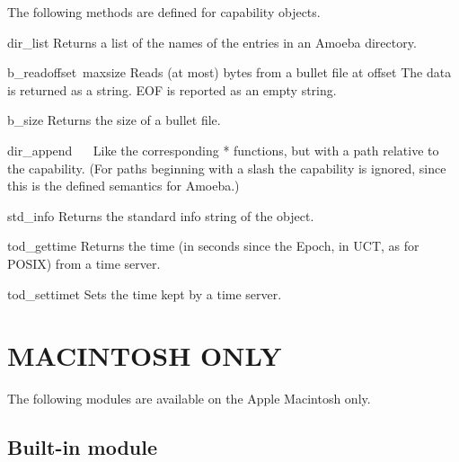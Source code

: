 The following methods are defined for capability objects.

\renewcommand{\indexsubitem}{(capability method)}
\begin{funcdesc}{dir_list}{}
Returns a list of the names of the entries in an Amoeba directory.
\end{funcdesc}

\begin{funcdesc}{b_read}{offset\, maxsize}
Reads (at most)
bytes from a bullet file at offset
The data is returned as a string.
EOF is reported as an empty string.
\end{funcdesc}

\begin{funcdesc}{b_size}{}
Returns the size of a bullet file.
\end{funcdesc}

\begin{funcdesc}{dir_append}{}
\ 
\ 
Like the corresponding
*
functions, but with a path relative to the capability.
(For paths beginning with a slash the capability is ignored, since this
is the defined semantics for Amoeba.)
\end{funcdesc}

\begin{funcdesc}{std_info}{}
Returns the standard info string of the object.
\end{funcdesc}

\begin{funcdesc}{tod_gettime}{}
Returns the time (in seconds since the Epoch, in UCT, as for POSIX) from
a time server.
\end{funcdesc}

\begin{funcdesc}{tod_settime}{t}
Sets the time kept by a time server.
\end{funcdesc}

\chapter{MACINTOSH ONLY}

The following modules are available on the Apple Macintosh only.

\section{Built-in module \sectcode{mac}}

